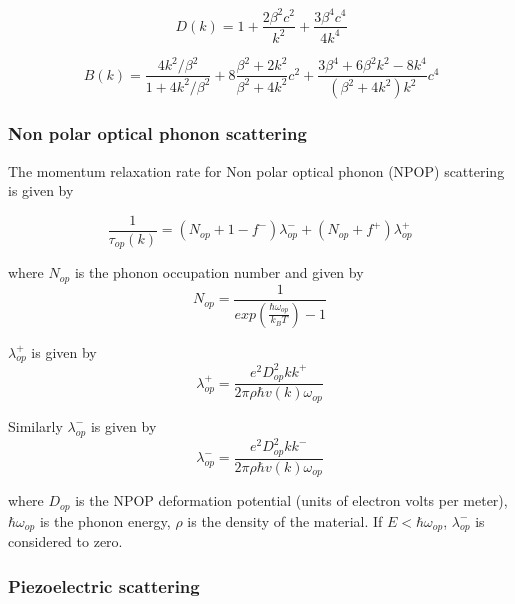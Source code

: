 \documentclass[12pt]{article}
\begin{document}
\begin{equation}
\ D(k) = 1 + \frac{2 \beta^2 c^2}{k^2} + \frac{3 \beta^4 c^4}{4 k^4}
\label{D(k)}
\end{equation} 

\begin{equation}
\ B(k) = \frac{4 k^2/\beta^2}{1 + 4 k^2/\beta^2} + 8 \frac{\beta^2+2k^2}{\beta^2+4k^2}c^2 +   \frac{3\beta^4+6\beta^2 k^2 -8k^4}{(\beta^2+4k^2)k^2}c^4
\label{B(k)}
\end{equation} 

\subsubsection{Non polar optical phonon scattering}
The momentum relaxation rate for Non polar optical phonon (NPOP) scattering is given by \cite{rode3}

\begin{equation}
\frac{1}{\tau_{op}(k)} = (N_{op} + 1 - f^-) \lambda_{op}^- + (N_{op} + f^+) \lambda_{op}^+ 
\label{npop_n}
\end{equation}

where $N_{op}$ is the phonon occupation number and given by
\begin{equation}
N_{op} = \frac{1}{exp(\frac{\hbar \omega_{op}}{k_B T})-1} 
\label{N_op}
\end{equation}  

$\lambda_{op}^+$ is given by
\begin{equation}
\lambda_{op}^+ = \frac{e^2D_{op}^2kk^+}{2 \pi \rho \hbar v(k) \omega_{op}} 
\label{lambda_op_pos}
\end{equation}  

Similarly $\lambda_{op}^-$ is given by
\begin{equation}
\lambda_{op}^- = \frac{e^2D_{op}^2 kk^-}{2 \pi \rho \hbar v(k) \omega_{op}} 
\label{lambda_op_neg}
\end{equation}  

where $D_{op}$ is the NPOP deformation potential (units of electron volts per meter), $\hbar \omega_{op}$ is the phonon energy, $\rho$ is the density of the material. If $E < \hbar \omega_{op}$,  $\lambda_{op}^-$ is considered to zero.\\ 


\subsubsection{Piezoelectric scattering}
\end{document}
